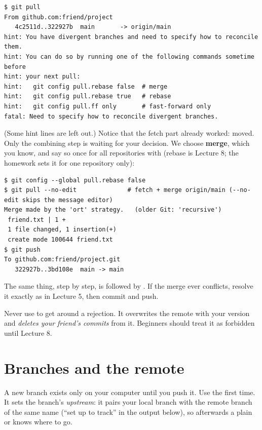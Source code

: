 \begin{lstlisting}
$ git pull
From github.com:friend/project
   4c2511d..322927b  main       -> origin/main
hint: You have divergent branches and need to specify how to reconcile them.
hint: You can do so by running one of the following commands sometime before
hint: your next pull:
hint:   git config pull.rebase false  # merge
hint:   git config pull.rebase true   # rebase
hint:   git config pull.ff only       # fast-forward only
fatal: Need to specify how to reconcile divergent branches.
\end{lstlisting}

(Some hint lines are left out.) Notice that the fetch part already worked:  moved. Only the combining step is waiting for your decision. We choose \textbf{merge}, which you know, and say so once for all repositories with  (rebase is Lecture 8; the homework sets it for one repository only):

\begin{lstlisting}
$ git config --global pull.rebase false
$ git pull --no-edit              # fetch + merge origin/main (--no-edit skips the message editor)
Merge made by the 'ort' strategy.   (older Git: 'recursive')
 friend.txt | 1 +
 1 file changed, 1 insertion(+)
 create mode 100644 friend.txt
$ git push
To github.com:friend/project.git
   322927b..3bd108e  main -> main
\end{lstlisting}

The same thing, step by step, is  followed by . If the merge ever conflicts, resolve it exactly as in Lecture 5, then commit and push.

\begin{quickfact}
Never use  to get around a rejection. It overwrites the remote with your version and \emph{deletes your friend's commits} from it. Beginners should treat it as forbidden until Lecture 8.
\end{quickfact}

\section{Branches and the remote}

A new branch exists only on your computer until you push it. Use  the first time. It sets the branch's \emph{upstream}: it pairs your local branch with the remote branch of the same name (``set up to track'' in the output below), so afterwards a plain  or  knows where to go.

